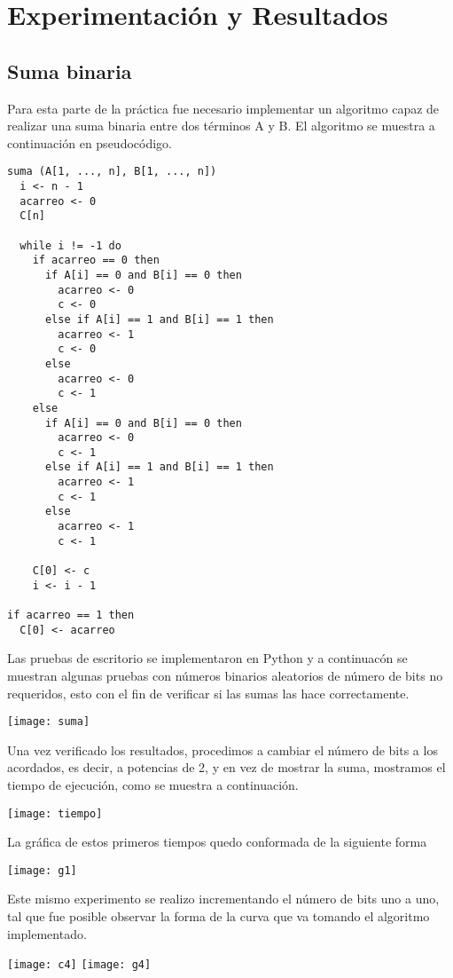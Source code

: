 \documentclass[12pt,twoside]{article}
\begin{document}
\section{Experimentaci\'on y Resultados}
\subsection{Suma binaria}
Para esta parte de la pr\'actica fue necesario implementar un algoritmo capaz de realizar una suma 
binaria entre dos t\'erminos A y B. El algoritmo se muestra a continuaci\'on en pseudoc\'odigo.
\begin{lstlisting}
suma (A[1, ..., n], B[1, ..., n])
  i <- n - 1
  acarreo <- 0
  C[n]

  while i != -1 do
	if acarreo == 0 then
	  if A[i] == 0 and B[i] == 0 then
	    acarreo <- 0
	    c <- 0
	  else if A[i] == 1 and B[i] == 1 then
	    acarreo <- 1
	    c <- 0
	  else
	    acarreo <- 0
	    c <- 1
	else
	  if A[i] == 0 and B[i] == 0 then
	    acarreo <- 0
	    c <- 1
	  else if A[i] == 1 and B[i] == 1 then
	    acarreo <- 1
	    c <- 1
	  else
	    acarreo <- 1
	    c <- 1

	C[0] <- c
	i <- i - 1

if acarreo == 1 then
  C[0] <- acarreo
\end{lstlisting}
Las pruebas de escritorio se implementaron en Python y a continuac\'on se muestran algunas pruebas con 
n\'umeros binarios aleatorios de n\'umero de bits no requeridos, esto con el fin de verificar si las sumas las 
hace correctamente.
\begin{center}
\texttt{[image: suma]}
\end{center}
Una vez verificado los resultados, procedimos a cambiar el n\'umero de bits a los acordados, es decir, a potencias 
de 2, y en vez de mostrar la suma, mostramos el tiempo de ejecuci\'on, como se muestra a continuaci\'on.
\begin{center}
\texttt{[image: tiempo]}
\end{center} 
La gr\'afica de estos primeros tiempos quedo conformada de la siguiente forma
\begin{center}
\texttt{[image: g1]}
\end{center}
Este mismo experimento se realizo incrementando el n\'umero de bits uno a uno, tal que fue posible observar la forma 
de la curva que va tomando el algoritmo implementado.
\begin{center}
\texttt{[image: c4]}
\texttt{[image: g4]}
\end{center}
\end{document}
